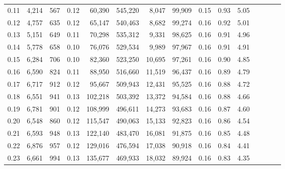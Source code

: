 \begin{tabular}{rrrcrrrrrrrrrrr}
0.11 &   4,214 &    567 &                                       0.12 &   60,390 &  545,220 &    8,047 &   99,909 &  0.15 &  0.93 &                         5.05 \\
0.12 &   4,757 &    635 &                                       0.12 &   65,147 &  540,463 &    8,682 &   99,274 &  0.16 &  0.92 &                         5.01 \\
0.13 &   5,151 &    649 &                                       0.11 &   70,298 &  535,312 &    9,331 &   98,625 &  0.16 &  0.91 &                         4.96 \\
0.14 &   5,778 &    658 &                                       0.10 &   76,076 &  529,534 &    9,989 &   97,967 &  0.16 &  0.91 &                         4.91 \\
0.15 &   6,284 &    706 &                                       0.10 &   82,360 &  523,250 &   10,695 &   97,261 &  0.16 &  0.90 &                         4.85 \\
0.16 &   6,590 &    824 &                                       0.11 &   88,950 &  516,660 &   11,519 &   96,437 &  0.16 &  0.89 &                         4.79 \\
0.17 &   6,717 &    912 &                                       0.12 &   95,667 &  509,943 &   12,431 &   95,525 &  0.16 &  0.88 &                         4.72 \\
0.18 &   6,551 &    941 &                                       0.13 &  102,218 &  503,392 &   13,372 &   94,584 &  0.16 &  0.88 &                         4.66 \\
0.19 &   6,781 &    901 &                                       0.12 &  108,999 &  496,611 &   14,273 &   93,683 &  0.16 &  0.87 &                         4.60 \\
0.20 &   6,548 &    860 &                                       0.12 &  115,547 &  490,063 &   15,133 &   92,823 &  0.16 &  0.86 &                         4.54 \\
0.21 &   6,593 &    948 &                                       0.13 &  122,140 &  483,470 &   16,081 &   91,875 &  0.16 &  0.85 &                         4.48 \\
0.22 &   6,876 &    957 &                                       0.12 &  129,016 &  476,594 &   17,038 &   90,918 &  0.16 &  0.84 &                         4.41 \\
0.23 &   6,661 &    994 &                                       0.13 &  135,677 &  469,933 &   18,032 &   89,924 &  0.16 &  0.83 &                         4.35 \\

\end{tabular}
